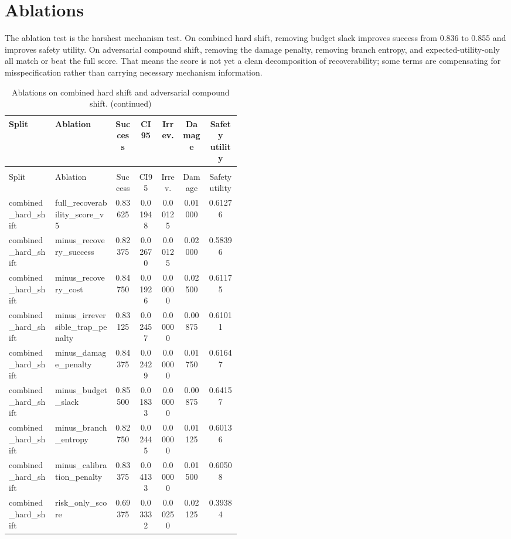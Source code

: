 \documentclass{article}
\begin{document}
\section{Ablations}

The ablation test is the harshest mechanism test. On combined hard shift, removing budget slack improves success from 0.836 to 0.855 and improves safety utility. On adversarial compound shift, removing the damage penalty, removing branch entropy, and expected-utility-only all match or beat the full score. That means the score is not yet a clean decomposition of recoverability; some terms are compensating for misspecification rather than carrying necessary mechanism information.

\begin{center}
\scriptsize
\begin{longtable}{p{0.20\linewidth}p{0.26\linewidth}ccccc}
\caption{Ablations on combined hard shift and adversarial compound shift.}\label{tab:ablations}\\
\toprule
Split & Ablation & Success & CI95 & Irrev. & Damage & Safety utility\\
\midrule
\endfirsthead
\caption[]{Ablations on combined hard shift and adversarial compound shift. (continued)}\\
\toprule
Split & Ablation & Success & CI95 & Irrev. & Damage & Safety utility\\
\midrule
\endhead
combined\_hard\_shift & full\_recoverability\_score\_v5 & 0.83625 & 0.01948 & 0.00125 & 0.01000 & 0.61276\\
combined\_hard\_shift & minus\_recovery\_success & 0.82375 & 0.02670 & 0.00125 & 0.02000 & 0.58396\\
combined\_hard\_shift & minus\_recovery\_cost & 0.84750 & 0.01926 & 0.00000 & 0.02500 & 0.61175\\
combined\_hard\_shift & minus\_irreversible\_trap\_penalty & 0.83125 & 0.02457 & 0.00000 & 0.00875 & 0.61011\\
combined\_hard\_shift & minus\_damage\_penalty & 0.84375 & 0.02429 & 0.00000 & 0.01750 & 0.61647\\
combined\_hard\_shift & minus\_budget\_slack & 0.85500 & 0.01833 & 0.00000 & 0.00875 & 0.64157\\
combined\_hard\_shift & minus\_branch\_entropy & 0.82750 & 0.02445 & 0.00000 & 0.01125 & 0.60136\\
combined\_hard\_shift & minus\_calibration\_penalty & 0.83375 & 0.04133 & 0.00000 & 0.01500 & 0.60508\\
combined\_hard\_shift & risk\_only\_score & 0.69375 & 0.03332 & 0.00250 & 0.02125 & 0.39384\\

\end{longtable}
\end{center}
\end{document}
